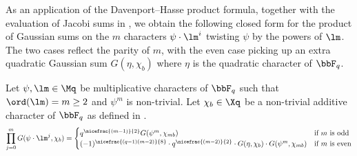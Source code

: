 As an application of the Davenport--Hasse product formula, together with the evaluation of Jacobi sums in , we obtain the following closed form for the product of Gaussian sums on the $m$ characters $\psi\cdot \lm^i$ twisting $\psi$ by the powers of $\lm$. The two cases reflect the parity of $m$, with the even case picking up an extra quadratic Gaussian sum $G(\eta,\chi_b)$ where $\eta$ is the quadratic character of $\bbF_q$.
\begin{corolary}{}{}
  Let $\psi,\lm\in\Mq$ be multiplicative characters of $\bbF_q$ such that $\ord(\lm)=m\geq 2$ and $\psi^m$ is non-trivial. Let $\chi_b\in\Xq$ be a non-trivial additive character of $\bbF_q$ as defined in .
  $$\prod_{j=0}^m G(\psi\cdot \lm^j,\chi_b) =\begin{cases}
    q^{\nicefrac{(m-1)}{2}}G(\psi^m,\chi_{mb}) & \text{if $m$ is odd}\\ 
    (-1)^{\nicefrac{(q-1)(m-2)}{8}}\cdot q^{\nicefrac{(m-2)}{2}}\cdot G(\eta,\chi_b)\cdot G(\psi^m,\chi_{mb})& \text{if $m$ is even}
  \end{cases}$$
\end{corolary}
